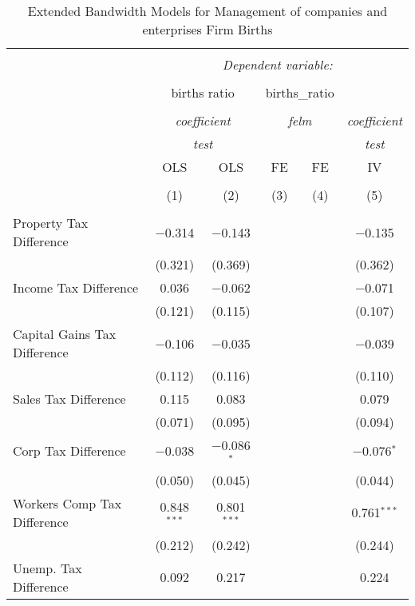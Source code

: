 
\begin{table}[!htbp] \centering 
  \caption{Extended Bandwidth Models for  Management of companies and enterprises Firm Births} 
  \label{} 
\begin{tabular}{@{\extracolsep{5pt}}lccccc} 
\\[-1.8ex]\hline 
\hline \\[-1.8ex] 
 & \multicolumn{5}{c}{\textit{Dependent variable:}} \\ 
\cline{2-6} 
\\[-1.8ex] & \multicolumn{2}{c}{births ratio} & \multicolumn{2}{c}{births\_ratio} &   \\ 
\\[-1.8ex] & \multicolumn{2}{c}{\textit{coefficient}} & \multicolumn{2}{c}{\textit{felm}} & \textit{coefficient} \\ 
 & \multicolumn{2}{c}{\textit{test}} & \multicolumn{2}{c}{\textit{}} & \textit{test} \\ 
 & OLS & OLS & FE & FE & IV \\ 
\\[-1.8ex] & (1) & (2) & (3) & (4) & (5)\\ 
\hline \\[-1.8ex] 
 Property Tax Difference & $-$0.314 & $-$0.143 &  &  & $-$0.135 \\ 
  & (0.321) & (0.369) &  &  & (0.362) \\ 
  Income Tax Difference & 0.036 & $-$0.062 &  &  & $-$0.071 \\ 
  & (0.121) & (0.115) &  &  & (0.107) \\ 
  Capital Gains Tax Difference & $-$0.106 & $-$0.035 &  &  & $-$0.039 \\ 
  & (0.112) & (0.116) &  &  & (0.110) \\ 
  Sales Tax Difference & 0.115 & 0.083 &  &  & 0.079 \\ 
  & (0.071) & (0.095) &  &  & (0.094) \\ 
  Corp Tax Difference & $-$0.038 & $-$0.086$^{*}$ &  &  & $-$0.076$^{*}$ \\ 
  & (0.050) & (0.045) &  &  & (0.044) \\ 
  Workers Comp Tax Difference & 0.848$^{***}$ & 0.801$^{***}$ &  &  & 0.761$^{***}$ \\ 
  & (0.212) & (0.242) &  &  & (0.244) \\ 
  Unemp. Tax Difference & 0.092 & 0.217 &  &  & 0.224 \\ 

\end{tabular}
\end{table}
